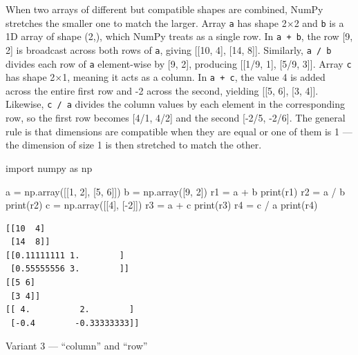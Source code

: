 \documentclass[
  english,
  letterpaper,
  DIV=11,
  numbers=noendperiod]{scrreprt}
\newenvironment{Shaded}{\begin{snugshade}}{\end{snugshade}}
\newcommand{\BuiltInTok}[1]{\textcolor[rgb]{0.00,0.23,0.31}{#1}}
\newcommand{\DecValTok}[1]{\textcolor[rgb]{0.68,0.00,0.00}{#1}}
\newcommand{\ImportTok}[1]{\textcolor[rgb]{0.00,0.46,0.62}{#1}}
\newcommand{\NormalTok}[1]{\textcolor[rgb]{0.00,0.23,0.31}{#1}}
\newcommand{\OperatorTok}[1]{\textcolor[rgb]{0.37,0.37,0.37}{#1}}
\begin{document}
When two arrays of different but compatible shapes are combined, NumPy
stretches the smaller one to match the larger. Array \texttt{a} has
shape 2×2 and \texttt{b} is a 1D array of shape (2,), which NumPy treats
as a single row. In \texttt{a\ +\ b}, the row {[}9, 2{]} is broadcast
across both rows of \texttt{a}, giving {[}{[}10, 4{]}, {[}14, 8{]}{]}.
Similarly, \texttt{a\ /\ b} divides each row of \texttt{a} element-wise
by {[}9, 2{]}, producing {[}{[}1/9, 1{]}, {[}5/9, 3{]}{]}. Array
\texttt{c} has shape 2×1, meaning it acts as a column. In
\texttt{a\ +\ c}, the value 4 is added across the entire first row and
-2 across the second, yielding {[}{[}5, 6{]}, {[}3, 4{]}{]}. Likewise,
\texttt{c\ /\ a} divides the column values by each element in the
corresponding row, so the first row becomes {[}4/1, 4/2{]} and the
second {[}-2/5, -2/6{]}. The general rule is that dimensions are
compatible when they are equal or one of them is 1 --- the dimension of
size 1 is then stretched to match the other.

\begin{Shaded}
\begin{Highlighting}[]
\ImportTok{import}\NormalTok{ numpy }\ImportTok{as}\NormalTok{ np}

\NormalTok{a }\OperatorTok{=}\NormalTok{ np.array([[}\DecValTok{1}\NormalTok{, }\DecValTok{2}\NormalTok{], [}\DecValTok{5}\NormalTok{, }\DecValTok{6}\NormalTok{]])}
\NormalTok{b }\OperatorTok{=}\NormalTok{ np.array([}\DecValTok{9}\NormalTok{, }\DecValTok{2}\NormalTok{])}
\NormalTok{r1 }\OperatorTok{=}\NormalTok{ a }\OperatorTok{+}\NormalTok{ b}
\BuiltInTok{print}\NormalTok{(r1)}
\NormalTok{r2 }\OperatorTok{=}\NormalTok{ a }\OperatorTok{/}\NormalTok{ b}
\BuiltInTok{print}\NormalTok{(r2)}
\NormalTok{c }\OperatorTok{=}\NormalTok{ np.array([[}\DecValTok{4}\NormalTok{], [}\OperatorTok{{-}}\DecValTok{2}\NormalTok{]])}
\NormalTok{r3 }\OperatorTok{=}\NormalTok{ a }\OperatorTok{+}\NormalTok{ c}
\BuiltInTok{print}\NormalTok{(r3)}
\NormalTok{r4 }\OperatorTok{=}\NormalTok{ c }\OperatorTok{/}\NormalTok{ a}
\BuiltInTok{print}\NormalTok{(r4)}
\end{Highlighting}
\end{Shaded}

\begin{verbatim}
[[10  4]
 [14  8]]
[[0.11111111 1.        ]
 [0.55555556 3.        ]]
[[5 6]
 [3 4]]
[[ 4.          2.        ]
 [-0.4        -0.33333333]]
\end{verbatim}

Variant 3 --- ``column'' and ``row''
\end{document}
